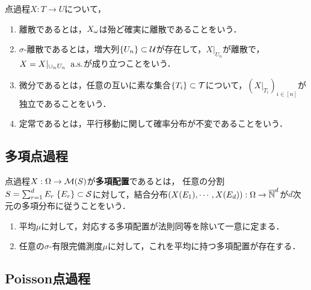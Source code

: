 \documentclass[uplatex,dvipdfmx]{jsreport}
\begin{document}
\begin{definition}
    点過程$X:T\to U$について，
    \begin{enumerate}
        \item 離散であるとは，$X_\om$は殆ど確実に離散であることをいう．
        \item $\sigma$-離散であるとは，増大列$\{U_n\}\subset\U$が存在して，$X|_{U_n}$が離散で，$X=X|_{\cup_nU_n}\;\as$が成り立つことをいう．
        \item 微分であるとは，任意の互いに素な集合$\{T_i\}\subset\cT$について，$(X|_{T_i})_{i\in[n]}$が独立であることをいう．
        \item 定常であるとは，平行移動に関して確率分布が不変であることをいう．
    \end{enumerate}
\end{definition}

\subsection{多項点過程}

\begin{definition}
    点過程$X:\Om\to\M(S)$が\textbf{多項配置}であるとは，
    任意の分割$S=\sum_{r=1}^dE_r\;\{E_r\}\subset\S$に対して，結合分布$(X(E_1),\cdots,X(E_d)):\Om\to\o{\N}^d$が$d$次元の多項分布に従うことをいう．
\end{definition}

\begin{lemma}\mbox{}
    \begin{enumerate}
        \item 平均$\mu$に対して，対応する多項配置が法則同等を除いて一意に定まる．
        \item 任意の$\sigma$-有限完備測度$\mu$に対して，これを平均に持つ多項配置が存在する．
    \end{enumerate}
\end{lemma}

\subsection{Poisson点過程}
\end{document}
